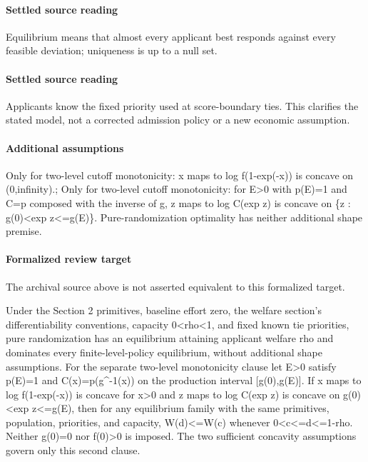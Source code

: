 \documentclass[10pt]{article}
\begin{document}
\paragraph{Settled source reading}
\begin{sloppypar}
Equilibrium means that almost every applicant best responds against every feasible deviation;\allowbreak{} uniqueness is up to a null set.\allowbreak{}
\end{sloppypar}
\paragraph{Settled source reading}
\begin{sloppypar}
Applicants know the fixed priority used at score-\allowbreak{}boundary ties.\allowbreak{} This clarifies the stated model, not a corrected admission policy or a new economic assumption.\allowbreak{}
\end{sloppypar}
\paragraph{Additional assumptions}
\begin{sloppypar}
Only for two-level cutoff monotonicity: x maps to log f(1-exp(-x)) is concave on (0,infinity).; Only for two-level cutoff monotonicity: for E>0 with p(E)=1 and C=p composed with the inverse of g, z maps to log C(exp z) is concave on \{z : g(0)<exp z<=g(E)\}. Pure-randomization optimality has neither additional shape premise.
\end{sloppypar}
\paragraph{Formalized review target}
The archival source above is not asserted equivalent to this formalized target.
\begin{ReviewVerbatim}
Under the Section 2 primitives, baseline effort zero, the welfare section's differentiability conventions, capacity 0<rho<1, and fixed known tie priorities, pure randomization has an equilibrium attaining applicant welfare rho and dominates every finite-level-policy equilibrium, without additional shape assumptions. For the separate two-level monotonicity clause let E>0 satisfy p(E)=1 and C(x)=p(g^{-1}(x)) on the production interval [g(0),g(E)]. If x maps to log f(1-exp(-x)) is concave for x>0 and z maps to log C(exp z) is concave on g(0)<exp z<=g(E), then for any equilibrium family with the same primitives, population, priorities, and capacity, W(d)<=W(c) whenever 0<c<=d<=1-rho. Neither g(0)=0 nor f(0)>0 is imposed. The two sufficient concavity assumptions govern only this second clause.
\end{ReviewVerbatim}
\end{document}
